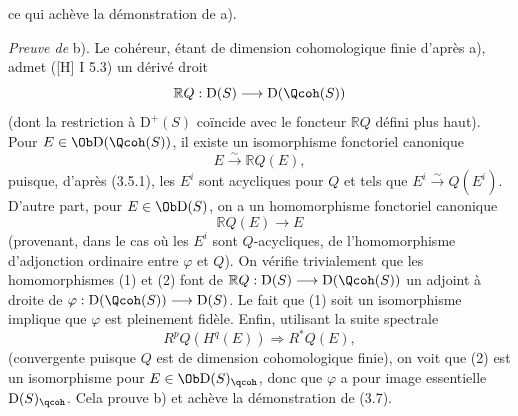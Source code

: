 ce qui achève la
démonstration de a).

\emph{Preuve de} b). Le cohéreur, étant de dimension cohomologique finie d'après a), admet ([H] I 5.3) un dérivé droit
\[
 \mathbb RQ:\mathrm D(S)\longrightarrow\mathrm D(\Qcoh(S))
\]
(dont la restriction à $\mathrm D^+(S)$ coïncide avec le foncteur $\mathbb RQ$ défini plus haut). Pour $E\in\Ob\mathrm D(\Qcoh(S))$, il existe un isomorphisme fonctoriel canonique
\begin{equation}\tag{1}
 E\xrightarrow{\sim}\mathbb RQ(E),
\end{equation}
puisque, d'après (3.5.1), les $E^i$ sont acycliques pour $Q$ et tels que $E^i\xrightarrow{\sim}Q(E^i)$. D'autre part, pour $E\in\Ob\mathrm D(S)$, on a un homomorphisme fonctoriel canonique
\begin{equation}\tag{2}
 \mathbb RQ(E)\longrightarrow E
\end{equation}
(provenant, dans le cas où les $E^i$ sont $Q$-acycliques, de l'homomorphisme d'adjonction ordinaire entre $\varphi$ et $Q$). On vérifie trivialement que les homomorphismes (1) et (2) font de $\mathbb RQ:\mathrm D(S)\longrightarrow\mathrm D(\Qcoh(S))$ un adjoint à droite de $\varphi:\mathrm D(\Qcoh(S))\longrightarrow\mathrm D(S)$. Le fait que (1) soit un isomorphisme implique que $\varphi$ est pleinement fidèle. Enfin, utilisant la suite spectrale
\[
 R^pQ(H^q(E))\Longrightarrow R^{*}Q(E),
\]
(convergente puisque $Q$ est de dimension cohomologique finie), on voit que (2) est un isomorphisme pour $E\in\Ob\mathrm D(S)_{\qcoh}$, donc que $\varphi$ a pour image essentielle $\mathrm D(S)_{\qcoh}$. Cela prouve b) et achève la démonstration de (3.7).

